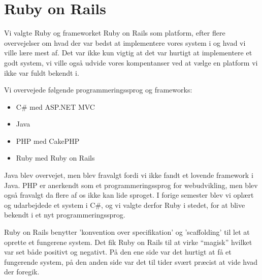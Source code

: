 ﻿\chapter{Ruby on Rails}
\label{akademiskror}

Vi valgte Ruby og frameworket Ruby on Rails som platform, efter flere overvejelser om hvad der var bedst at implementere vores system i og hvad vi ville lære mest af. Det var ikke kun vigtig at det var hurtigt at implementere et godt system, vi ville også udvide vores kompentanser ved at vælge en platform vi ikke var fuldt bekendt i.

Vi overvejede følgende programmeringssprog og frameworks:
\begin{itemize}
\item C\# med ASP.NET MVC
\item Java
\item PHP med CakePHP
\item Ruby med Ruby on Rails
\end{itemize}

Java blev overvejet, men blev fravalgt fordi vi ikke fandt et lovende framework i Java. PHP er anerkendt som et programmeringssprog for webudvikling, men blev også fravalgt da flere af os ikke kan lide sproget. I forige semester blev vi oplært og udarbejdede et system i C\#, og vi valgte derfor Ruby i stedet, for at blive bekendt i et nyt programmeringssprog.

Ruby on Rails benytter 'konvention over specifikation' og 'scaffolding' til let at oprette et fungerene system. Det fik Ruby on Rails til at virke ``magisk'' hvilket var set både positivt og negativt. På den ene side var det hurtigt at få et fungerende system, på den anden side var det til tider svært præcist at vide hvad der foregik.



